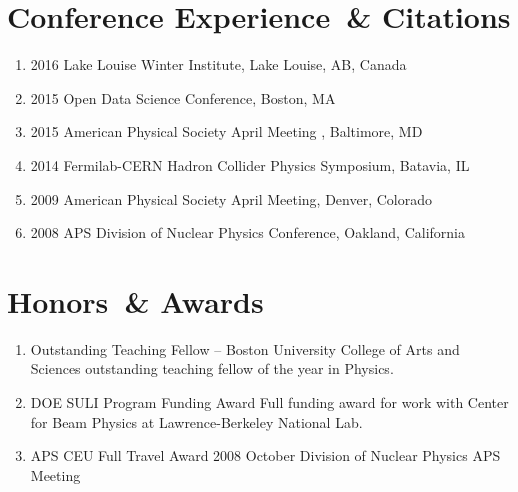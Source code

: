 
\section*{Conference Experience~\& Citations}



\begin{enumerate}
 0cm \linewidth \listindent \dimexpr\linewidth-\listindent\relax

\item[] 2016 Lake Louise Winter Institute, Lake Louise, AB, Canada 
\item[] 2015 Open Data Science Conference, Boston, MA
\item[] 2015 American Physical Society April Meeting , Baltimore, MD
\item[] 2014 Fermilab-CERN Hadron Collider Physics Symposium, Batavia, IL
\item[] 2009 American Physical Society April Meeting, Denver, Colorado 
\item[] 2008 APS Division of Nuclear Physics Conference, Oakland, California 
\end{enumerate}


\section*{Honors~\& Awards}


\begin{enumerate}
 0cm \linewidth \listindent \dimexpr\linewidth-\listindent\relax
\item[] Outstanding Teaching Fellow \hfill {} --  \newline
Boston University College of Arts and Sciences outstanding teaching fellow of the year in Physics.


\item[] DOE SULI Program Funding Award \hfill {}\newline
{Full funding award for work with Center for Beam Physics at Lawrence-Berkeley National Lab.
}


\item[] APS CEU Full Travel Award \hfill {} \newline
{2008 October Division of Nuclear Physics APS Meeting}


\end{enumerate}

